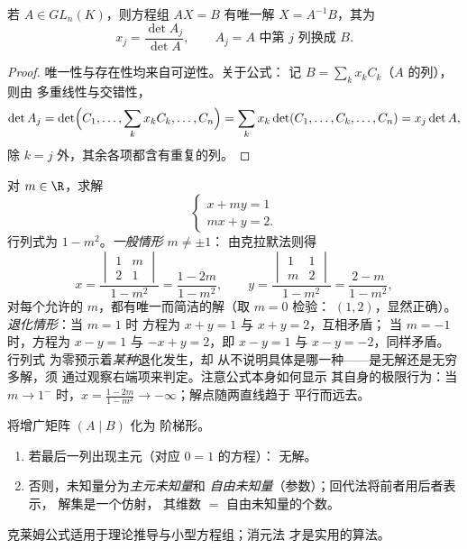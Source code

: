 \begin{theorem}[方阵的克拉默方程组]\label{thm:b1:det:cramer}
若 $A \in GL_n(K)$，则方程组 $AX = B$ 有唯一解 $X =
A^{-1}B$，其为
\[
x_j = \frac{\det A_j}{\det A},
\qquad A_j = A \text{ 中第 } j \text{ 列换成 } B .
\]
\end{theorem}

\begin{proof}
唯一性与存在性均来自可逆性。关于公式：
记 $B = \sum_k x_k C_k$（$A$ 的列），则由
多重线性与交错性，
\[
\det A_j = \det\Bigl(C_1, \dots, \sum_k x_k C_k, \dots, C_n\Bigr)
= \sum_k x_k \det(C_1, \dots, C_k, \dots, C_n)
= x_j \det A ,
\]
除 $k = j$ 外，其余各项都含有重复的列。
\end{proof}

\begin{example}[含参数的克拉默法则完整示例]
\label{ex:b1:det:cramerparameter}
对 $m \in \R$，求解
\[
\begin{cases}
x + m y = 1\\
m x + y = 2 .
\end{cases}
\]
行列式为 $1 - m^2$。\emph{一般情形} $m \neq \pm1$：
由克拉默法则得
\[
x = \frac{\begin{vmatrix} 1 & m\\ 2 & 1\end{vmatrix}}{1 - m^2}
= \frac{1 - 2m}{1 - m^2},
\qquad
y = \frac{\begin{vmatrix} 1 & 1\\ m & 2\end{vmatrix}}{1 - m^2}
= \frac{2 - m}{1 - m^2},
\]
对每个允许的 $m$，都有唯一而简洁的解（取 $m = 0$ 检验：
$(1, 2)$，显然正确）。\emph{退化情形}：当 $m = 1$ 时
方程为 $x + y = 1$ 与 $x + y = 2$，互相矛盾；
当 $m = -1$ 时，方程为 $x - y = 1$ 与 $-x + y = 2$，即 $x - y =
1$ 与 $x - y = -2$，同样矛盾。行列式
为零预示着\emph{某种}退化发生，却
从不说明具体是哪一种——是无解还是无穷多解，须
通过观察右端项来判定。注意公式本身如何显示
其自身的极限行为：当 $m \to 1^{-}$ 时，$x = \frac{1 - 2m}{1 - m^2} \to
-\infty$；解点随两直线趋于
平行而远去。
\end{example}

\begin{method}[用高斯消元法解方程组]\label{met:b1:det:gauss}
将增广矩阵 $(A \mid B)$ 化为
阶梯形。
\begin{enumerate}
  \item 若最后一列出现主元（对应 $0 = 1$ 的方程）：
        无解。
  \item 否则，未知量分为\emph{主元未知量}和
        \emph{自由未知量}（参数）；回代法将前者用后者表示，
        解集是一个仿射，
        其维数 $=$ 自由未知量的个数。
\end{enumerate}
克莱姆公式适用于理论推导与小型方程组；消元法
才是实用的算法。
\end{method}

